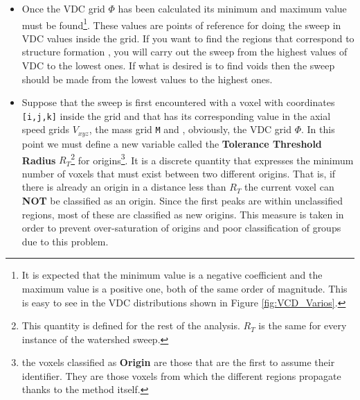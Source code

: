 \documentclass[a4paper,fleqn,usenatbib]{mnras}
\begin{document}
\begin{itemize}
    \item Once the VDC grid $\Phi$ has been calculated its minimum  and maximum value must be found\footnote{It is expected that the minimum value is a negative coefficient and the maximum value is a positive one, both of the same order of magnitude. This is easy to see in the VDC distributions shown in Figure \ref{fig:VCD_Varios}.}. These values are points of reference for doing the sweep in VDC values inside the grid. If you want to find the regions that correspond to structure formation , you will carry out the sweep from the highest values of VDC to the lowest ones. If what is desired is to find voids then the sweep should be made from the lowest values to the highest ones.
    
    \item Suppose that the sweep is first encountered with a voxel with coordinates \texttt{[i,j,k]} inside the grid and that has its corresponding value in the axial speed grids $V_{xyz}$, the mass grid \texttt{M} and , obviously, the VDC grid $\Phi$. In this point we must define a new variable called the \textbf{Tolerance Threshold Radius} $R_T$\footnote{This quantity is defined for the rest of the analysis. $R_T$ is the same for every instance of the watershed sweep.} for origins\footnote{the voxels classified as \textbf{Origin} are those that are the first to assume their identifier. They are those voxels from which the different regions propagate thanks to the method itself.}.  It is a discrete quantity that expresses the minimum number of voxels that must exist between two different origins. That is, if there is already an origin in a distance less than $R_T$ the current voxel can \textbf{NOT} be classified as an origin. Since the first peaks are within unclassified regions, most of these are classified as new origins. This measure is taken in order to prevent over-saturation of origins and poor classification of groups due to this problem.
    

\end{itemize}
\end{document}
